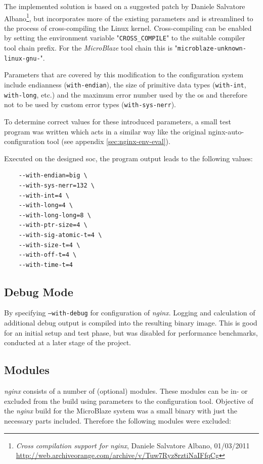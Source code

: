The implemented solution is based on a suggested patch by Daniele Salvatore Albano\footnote{\textit{Cross compilation support for nginx}, Daniele Salvatore Albano, 01/03/2011 \url{http://web.archiveorange.com/archive/v/Tuw7Ryz8rztiNaIFfqCg}}, but incorporates more of the existing parameters and is streamlined to the process of cross-compiling the Linux kernel. Cross-compiling can be enabled by setting the environment variable "\texttt{CROSS\_COMPILE}" to the suitable compiler tool chain prefix. For the \textit{MicroBlaze} tool chain this is "\texttt{microblaze-unknown-linux-gnu-}".

Parameters that are covered by this modification to the configuration system include endianness (\texttt{with-endian}), the size of primitive data types (\texttt{with-int}, \texttt{with-long}, etc.) and the maximum error number used by the \gls{os} and therefore not to be used by custom error types (\texttt{with-sys-nerr}).

To determine correct values for these introduced parameters, a small test program was written which acts in a similar way like the original nginx-auto-configuration tool (see appendix \ref{sec:nginx-env-eval}). 

Executed on the designed \gls{soc}, the program output leads to the following values:

\begin{verbatim}
    --with-endian=big \
    --with-sys-nerr=132 \
    --with-int=4 \
    --with-long=4 \
    --with-long-long=8 \
    --with-ptr-size=4 \
    --with-sig-atomic-t=4 \
    --with-size-t=4 \
    --with-off-t=4 \
    --with-time-t=4
\end{verbatim}

\subsection{Debug Mode}

By specifying \texttt{--with-debug} for configuration of \textit{nginx}. Logging and calculation of additional debug output is compiled into the resulting binary image. This is good for an initial setup and test phase, but was disabled for performance benchmarks, conducted at a later stage of the project.

\clearpage
\subsection{Modules}

\textit{nginx} consists of a number of (optional) modules. These modules can be in- or excluded from the build using parameters to the configuration tool. Objective of the \textit{nginx} build for the MicroBlaze system was a small binary with just the necessary parts included. Therefore the following modules were excluded:

